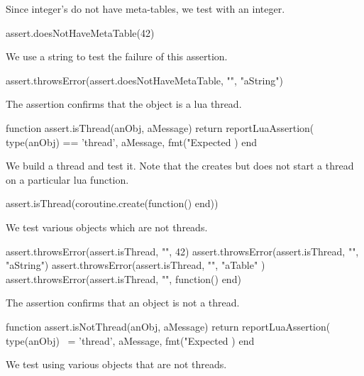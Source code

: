 Since integer's do not have meta-tables, we test with an integer.

\startLuaTest
  assert.doesNotHaveMetaTable(42)
\stopLuaTest
\stopTestCase


We use a string to test the failure of this assertion. 

\startLuaTest
  assert.throwsError(assert.doesNotHaveMetaTable, "", "aString")
\stopLuaTest
\stopTestCase

\stopTestSuite


The  assertion confirms that the object is a lua 
thread. 

\startLuaCode
function assert.isThread(anObj, aMessage)
  return reportLuaAssertion(
    type(anObj) == 'thread',
    aMessage,
    fmt("Expected %
  )
end
\stopLuaCode


We build a thread and test it. Note that the  
creates but does not start a thread on a particular lua function. 

\startLuaTest
  assert.isThread(coroutine.create(function() end))
\stopLuaTest
\stopTestCase


We test various objects which are not threads.

\startLuaTest
  assert.throwsError(assert.isThread, "", 42)
  assert.throwsError(assert.isThread, "", "aString")
  assert.throwsError(assert.isThread, "", { "aTable" })
  assert.throwsError(assert.isThread, "", function() end)
\stopLuaTest
\stopTestCase

\stopTestSuite


The  assertion confirms that an object is not a 
thread. 

\startLuaCode
function assert.isNotThread(anObj, aMessage)
  return reportLuaAssertion(
    type(anObj) ~= 'thread',
    aMessage,
    fmt("Expected %
  )
end
\stopLuaCode


We test using various objects that are not threads. 

